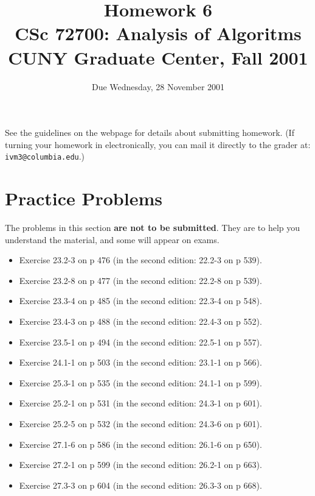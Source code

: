 \documentclass[11pt]{article}
\begin{document}
\title{Homework 6\\
       CSc 72700: Analysis of Algoritms\\
       CUNY Graduate Center, Fall 2001 }
\date{Due Wednesday, 28 November 2001}
\author{}
\maketitle

See the guidelines on the webpage for details about submitting homework.
(If turning your homework in electronically, you can mail it directly
to the grader at: {\tt ivm3@columbia.edu}.)

\section*{Practice Problems}

The problems in this section {\bf are not to be submitted}.  They are to
help you understand the material, and some will appear on exams.

\begin{itemize}
    \item Exercise 23.2-3 on p 476 (in the second edition: 22.2-3 on p 539).
    \item Exercise 23.2-8 on p 477 (in the second edition: 22.2-8 on p 539).
    \item Exercise 23.3-4 on p 485 (in the second edition: 22.3-4 on p 548).
    \item Exercise 23.4-3 on p 488 (in the second edition: 22.4-3 on p 552).
    \item Exercise 23.5-1 on p 494 (in the second edition: 22.5-1 on p 557).
    \item Exercise 24.1-1 on p 503 (in the second edition: 23.1-1 on p 566).
    \item Exercise 25.3-1 on p 535 (in the second edition: 24.1-1 on p 599).
    \item Exercise 25.2-1 on p 531 (in the second edition: 24.3-1 on p 601).
    \item Exercise 25.2-5 on p 532 (in the second edition: 24.3-6 on p 601).
    \item Exercise 27.1-6 on p 586 (in the second edition: 26.1-6 on p 650).
    \item Exercise 27.2-1 on p 599 (in the second edition: 26.2-1 on p 663).
    \item Exercise 27.3-3 on p 604 (in the second edition: 26.3-3 on p 668).
\end{itemize}
\end{document}
